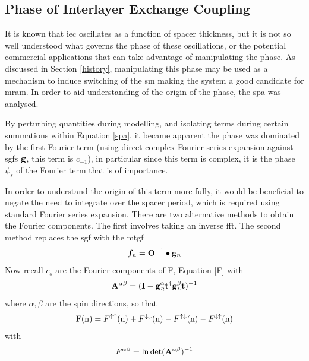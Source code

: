 \documentclass[a4paper, 12pt]{article}
\begin{document}
\subsection{Phase of Interlayer Exchange Coupling}
\par It is known that \gls{iec} oscillates as a function of spacer thickness, but it is not so well understood what governs the phase of these oscillations, or the potential commercial applications that can take advantage of manipulating the phase. As discussed in Section \ref{history}, manipulating this phase may be used as a mechanism to induce switching of the \gls{sm} making the system a good candidate for \gls{mram}. In order to aid understanding of the origin of the phase, 
the \gls{spa} was analysed.
\\\par By perturbing quantities during modelling, and isolating terms during certain summations within Equation \eqref{spa}, it became apparent the phase was dominated by the first Fourier term (using direct complex Fourier series expansion against \gls{sgf}s $\bf g$, this term is $c_{-1}$), in particular since this term is complex, it is the phase $\psi_s$ of the Fourier term that is of importance.
\\\par In order to understand the origin of this term more fully, it would be beneficial to negate the need to integrate over the spacer period, which is required using standard Fourier series expansion.
There are two alternative methods to obtain the Fourier components. The first involves taking an inverse \gls{fft}.
The second method replaces the \gls{sgf} with the \gls{mtgf} 
\begin{equation}\label{fn}
	\bm f_n = {\bf O}^{-1}\bullet {\bf g}_n
\end{equation}
Now recall $c_s$ are the Fourier components of F, Equation \eqref{F} with
\begin{equation}
	{\bf A}^{\alpha\beta} = ({\bf I - g}_{\scriptscriptstyle R}^{\alpha}{\bf t}^\dag {\bf g}_{\scriptscriptstyle L}^{\beta}{\bf t})^{-1}
\end{equation}
where $\alpha, \beta$ are the spin directions, so that
\begin{equation}\label{effs}
	{\rm F(n)} = F^{\uparrow\uparrow}({\rm n})+F^{\downarrow\downarrow}({\rm n}) - F^{\uparrow\downarrow}({\rm n})-F^{\downarrow\uparrow}({\rm n})
\end{equation}
with
\begin{equation}
	F^{\alpha\beta} = \ln\det({\bf A}^{\alpha\beta})^{-1}
\end{equation}
\end{document}
